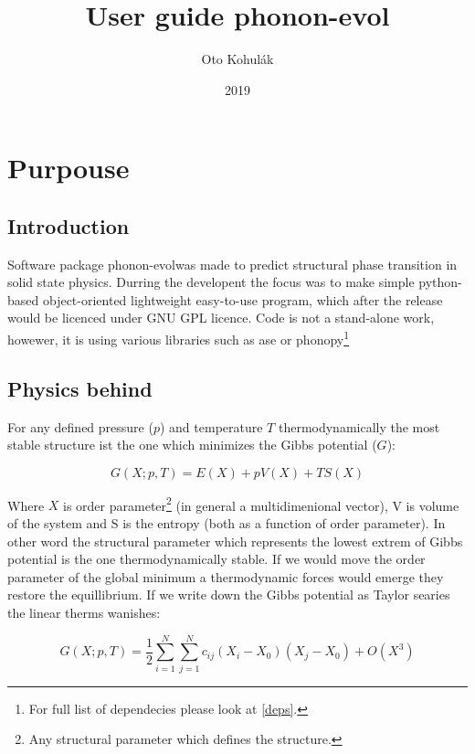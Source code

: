 \documentclass[12pt]{article}
\begin{document}
\newcommand{\pe}{phonon-evol}

\title{User guide \pe}
\date{2019}
\author{Oto Kohul\'{a}k}

\maketitle

\tableofcontents

\section{Purpouse}

\subsection{Introduction}
Software package \pe was made to predict structural phase transition in solid state physics. Durring the developent the focus was to make simple python-based object-oriented lightweight easy-to-use program, which after the release would be licenced under GNU GPL licence\cite{GPL}. Code is not a stand-alone work, howewer, it is using various libraries such as ase or phonopy\footnote{For full list of dependecies please look at \ref{deps}.}

\subsection{Physics behind}

For any defined pressure ($p$) and temperature $T$ thermodynamically the most stable structure ist the one which minimizes the Gibbs potential ($G$):

\begin{equation}
G(X; p, T) = E(X) + pV(X) + TS(X)
\end{equation}

Where $X$ is order parameter\footnote{Any structural parameter which defines the structure.} (in general a multidimenional vector), V is volume of the system and S is the entropy (both as a function of order parameter). In other word the structural parameter which represents the lowest extrem of Gibbs potential is the one thermodynamically stable. If we would move the order parameter of the global minimum a thermodynamic forces would emerge they restore the equillibrium. If we write down the Gibbs potential as Taylor searies the linear therms wanishes:

\begin{equation}
G(X; p, T) = \frac{1}{2}\sum_{i = 1}^N \sum_{j = 1}^N c_{ij} (X_i - X_0) (X_j - X_0) + O(X^3)
\end{equation}
\end{document}
